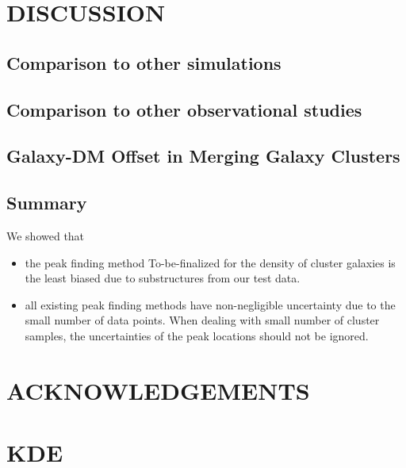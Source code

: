 \documentclass[letterpaper,useAMS,usenatbib]{mn2e}
\begin{document}
\section{DISCUSSION}
\subsection{Comparison to other simulations}
\subsection{Comparison to other observational studies}
\subsection{Galaxy-DM Offset in Merging Galaxy Clusters}
\subsection{Summary}
We showed that 
\begin{itemize}
		\item  the peak finding method To-be-finalized for the density of cluster
			galaxies is the least biased due to substructures from our test data. 
		\item  all existing peak finding methods have non-negligible uncertainty 
			due to the small number of data points. When dealing with small number of
			cluster samples, the uncertainties of the peak locations should not be
			ignored.
\end{itemize}

\section{ACKNOWLEDGEMENTS}




\appendix
\section{KDE}
\clearpage\bsp\label{lastpage} 
\end{document}
